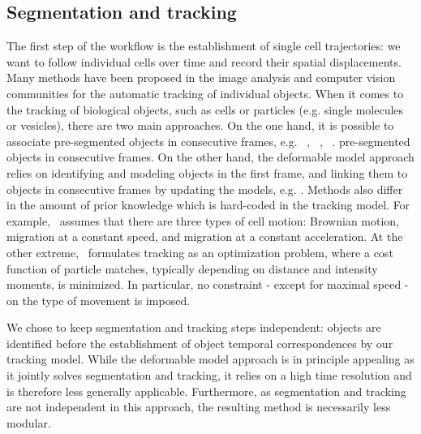\subsection{Segmentation and tracking}
\label{sec:motiw_seg}
\label{sec:celltracking}

%
The first step of the workflow is the establishment of single cell
trajectories: we want to follow individual cells over time and record
their spatial displacements. Many methods have been proposed in the
image analysis and computer vision communities for the automatic
tracking of individual objects. When it comes to the tracking of
biological objects, such as cells or particles (e.g.
single molecules or vesicles), there are two main approaches. On the one hand, it is possible to associate pre-segmented objects in consecutive frames, e.g. ~\cite{lou},
~\cite{citeulike:11229467}, ~\cite{Chenouard2014}.%
pre-segmented objects in consecutive frames. On the other hand, the deformable model approach relies on identifying and modeling objects in the first frame, and linking them to objects in consecutive frames by updating the models, e.g. \cite{pmid12585703}. Methods also differ in the amount of prior knowledge which is hard-coded in the tracking model. For example,~\cite{pmid18656418} assumes that there are three types of
cell motion: Brownian motion, migration at a constant speed, and
migration at a constant acceleration. At the other
extreme,~\cite{pmid16043363} formulates tracking as an optimization
problem, where a cost function of particle matches, typically depending on distance and
intensity moments, is minimized.  
In particular, no constraint - except for maximal speed - on
the type of movement is imposed. 

We chose to keep segmentation and tracking steps independent: objects are identified before the establishment of object temporal correspondences by our tracking model. While the deformable model approach is in principle appealing as it jointly solves segmentation and tracking, it relies on a high time resolution and is therefore less generally applicable. Furthermore, as segmentation and tracking are not independent in this approach,
the resulting method is necessarily less modular.  

